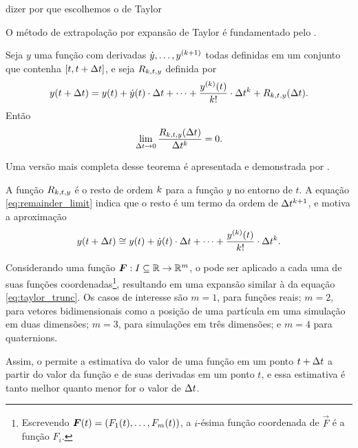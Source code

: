 \alert{dizer por que escolhemos o de Taylor}

O método de extrapolação por expansão de Taylor é fundamentado pelo .

\begin{theorem} \label{theo:taylor}
	Seja \(y\) uma função com derivadas \(\deriv{1}{y},\dots,y^{\pqty{\taylorOrder+1}}\) todas definidas em um conjunto que contenha \(\bqty{t, t+\Dt}\), e seja \(R_{k, t, y}\) definida por
    \begin{equation*}
    	y(t + \Dt) = y(t) + \deriv{1}{y}(t)\cdot\Dt + \dots + \dfrac{\deriv{\taylorOrder}{y}(t)}{\taylorOrder!}\cdot\Dt^\taylorOrder + R_{\taylorOrder, t, y}(\Dt).
    \end{equation*}
    Então
    \begin{equation} \label{eq:remainder_limit}
    	\lim_{\Delta t \rightarrow 0} \dfrac{R_{k, t, y}(\Delta t)}{\Delta t^k} = 0.
    \end{equation}
\end{theorem}

Uma versão mais completa desse teorema é apresentada e demonstrada por .

A função \(R_{k, t, y}\) é o resto de ordem \(k\) para a função \(y\) no entorno de \(t\). A equação \eqref{eq:remainder_limit} indica que o resto é um termo da ordem de \(\Delta t^{k+1}\), e motiva a aproximação
\begin{equation} \label{eq:taylor_trunc}
    y(t + \Dt) \approximately y(t) + \deriv{1}{y}(t)\cdot\Dt + \dots + \dfrac{\deriv{\taylorOrder}{y}(t)}{\taylorOrder!}\cdot\Dt^\taylorOrder.
\end{equation}

Considerando uma função \(\bm{F}:I\subseteq \mathbb{R} \rightarrow \mathbb{R}^m\), o  pode ser aplicado a cada uma de suas funções coordenadas\footnote{Escrevendo \(\vec{F}(t) = \pqty{F_1(t),\dots,F_m(t)}\), a \(i\)-ésima função coordenada de \(\vec{F}\) é a função \(F_i\).}, resultando em uma expansão similar à da equação \eqref{eq:taylor_trunc}. Os casos de interesse são \(m=1\), para funções reais; \(m=2\), para vetores bidimensionais como a posição de uma partícula em uma simulação em duas dimensões; \(m=3\), para simulações em três dimensões; \alert{e \(m=4\) para quaternions}.

Assim, o  permite a estimativa do valor de uma função em um ponto \(t+\Delta t\) a partir do valor da função e de suas derivadas em um ponto \(t\), e essa estimativa é tanto melhor quanto menor for o valor de \(\Delta t\).


